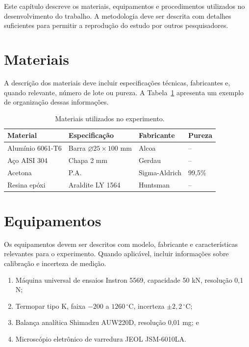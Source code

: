Este capítulo descreve os materiais, equipamentos e procedimentos utilizados no desenvolvimento do trabalho. A metodologia deve ser descrita com detalhes suficientes para permitir a reprodução do estudo por outros pesquisadores.

\section{Materiais}

A descrição dos materiais deve incluir especificações técnicas, fabricantes e, quando relevante, número de lote ou pureza. A Tabela~\ref{tab:materiais} apresenta um exemplo de organização dessas informações.

\begin{table}[ht]
\centering
\caption{Materiais utilizados no experimento.}
\label{tab:materiais}
\begin{tabular}{llll}
\toprule
Material & Especificação & Fabricante & Pureza \\
\midrule
Alumínio 6061-T6 & Barra $\varnothing 25 \times 100$ mm & Alcoa & -- \\
Aço AISI 304 & Chapa 2 mm & Gerdau & -- \\
Acetona & P.A. & Sigma-Aldrich & 99,5\% \\
Resina epóxi & Araldite LY 1564 & Huntsman & -- \\
\bottomrule
\end{tabular}
\end{table}

\section{Equipamentos}

Os equipamentos devem ser descritos com modelo, fabricante e características relevantes para o experimento. Quando aplicável, incluir informações sobre calibração e incerteza de medição.

\begin{enumerate}
    \item Máquina universal de ensaios Instron 5569, capacidade 50 kN, resolução 0,1 N;
    \item Termopar tipo K, faixa $-200$ a $1260\,^{\circ}$C, incerteza $\pm 2,2\,^{\circ}$C;
    \item Balança analítica Shimadzu AUW220D, resolução 0,01 mg; e
    \item Microscópio eletrônico de varredura JEOL JSM-6010LA.
\end{enumerate}

